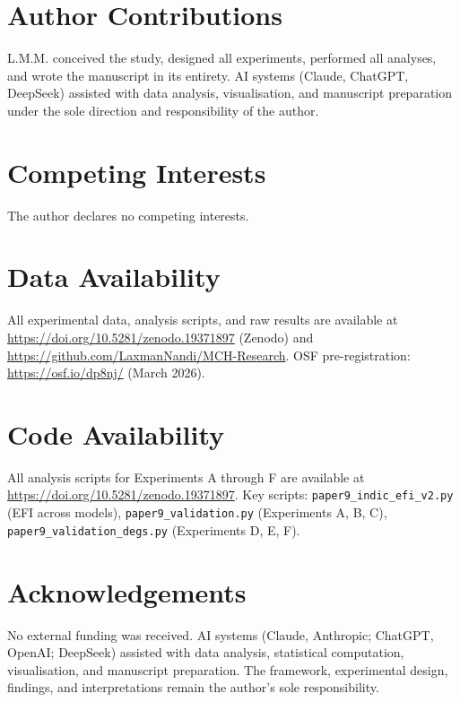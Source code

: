 \documentclass[11pt,a4paper]{article}
\begin{document}
\section*{Author Contributions}

L.M.M. conceived the study, designed all experiments, performed all analyses, and wrote
the manuscript in its entirety. AI systems (Claude, ChatGPT, DeepSeek) assisted with
data analysis, visualisation, and manuscript preparation under the sole direction and
responsibility of the author.

\section*{Competing Interests}

The author declares no competing interests.

\section*{Data Availability}

All experimental data, analysis scripts, and raw results are available at
\url{https://doi.org/10.5281/zenodo.19371897} (Zenodo) and
\url{https://github.com/LaxmanNandi/MCH-Research}. OSF pre-registration:
\url{https://osf.io/dp8nj/} (March 2026).

\section*{Code Availability}

All analysis scripts for Experiments A through F are available at
\url{https://doi.org/10.5281/zenodo.19371897}. Key scripts:
\texttt{paper9\_indic\_efi\_v2.py} (EFI across models),
\texttt{paper9\_validation.py} (Experiments A, B, C),
\texttt{paper9\_validation\_degs.py} (Experiments D, E, F).

\section*{Acknowledgements}

No external funding was received. AI systems (Claude, Anthropic; ChatGPT, OpenAI;
DeepSeek) assisted with data analysis, statistical computation, visualisation, and
manuscript preparation. The framework, experimental design, findings, and interpretations
remain the author's sole responsibility.
\end{document}
